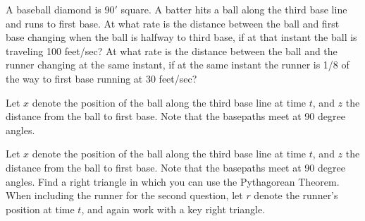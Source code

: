 \begin{activity} \label{A:3.5.4}  
A baseball diamond is $90'$ square.  A batter hits a ball along the third base line and runs to first base.  At what rate is the distance between the ball and first base changing when the ball is halfway to third base, if at that instant the ball is traveling 100 feet/sec?  At what rate is the distance between the ball and the runner changing at the same instant, if at the same instant the runner is 1/8 of the way to first base running at 30 feet/sec?
\end{activity}
\begin{smallhint}
Let $x$ denote the position of the ball along the third base line at time $t$, and $z$ the distance from the ball to first base.  Note that the basepaths meet at 90 degree angles.
\end{smallhint}
\begin{bighint}
Let $x$ denote the position of the ball along the third base line at time $t$, and $z$ the distance from the ball to first base.  Note that the basepaths meet at 90 degree angles.  Find a right triangle in which you can use the Pythagorean Theorem.  When including the runner for the second question, let $r$ denote the runner's position at time $t$, and again work with a key right triangle.
\end{bighint}
